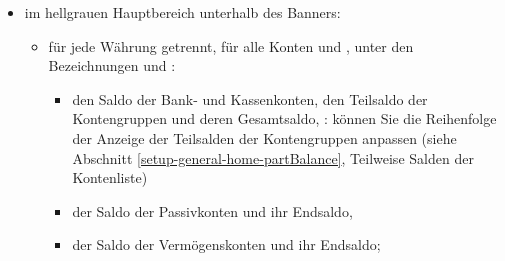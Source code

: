 \begin{itemize}
\begin{itemize}
\begin{itemize}
					\item die : den Namen des Inhabers (oder des Kontoverwalters) des zuletzt aufgerufenen Kontos; wenn der Inhaber nicht in den Kontoeigenschaften definiert ist, zeigt Grisbi den Namen dieses Kontos an,%
			 		\item die : Dies ist der Name der Datei im aktuellen Verzeichnis in der Form ;%
			 	\end{itemize}
		\end{itemize}
	\item im hellgrauen Hauptbereich unterhalb des Banners:%
	 	\begin{itemize}
	 		\item für jede Währung getrennt, für alle Konten und , unter den Bezeichnungen  und :%
				\begin{itemize}
					\item den Saldo der Bank- und Kassenkonten, den Teilsaldo der Kontengruppen und deren Gesamtsaldo,%
					\newline
					\Note{}: können Sie die Reihenfolge der Anzeige der Teilsalden der Kontengruppen anpassen (siehe Abschnitt \vref{setup-general-home-partBalance}, Teilweise Salden der Kontenliste)%
					\item der Saldo der Passivkonten und ihr Endsaldo,%
					\item der Saldo der Vermögenskonten und ihr Endsaldo;%
				\end{itemize}

\end{itemize}
\end{itemize}
